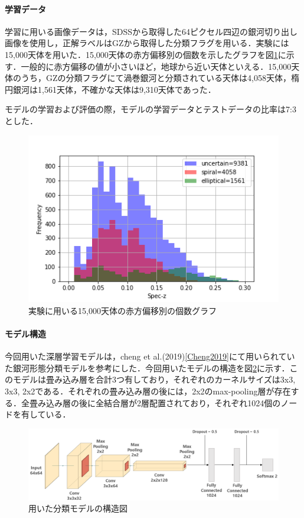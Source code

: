 \documentclass[a4j, 11pt]{jarticle}
\begin{document}
\paragraph{学習データ}
学習に用いる画像データは，SDSSから取得した64ピクセル四辺の銀河切り出し画像を使用し，正解ラベルはGZから取得した分類フラグを用いる．実験には15,000天体を用いた．15,000天体の赤方偏移別の個数を示したグラフを図\ref{fig:z_15000}に示す．一般的に赤方偏移の値が小さいほど，地球から近い天体といえる．15,000天体のうち，GZの分類フラグにて渦巻銀河と分類されている天体は4,058天体，楕円銀河は1,561天体，不確かな天体は9,310天体であった．

モデルの学習および評価の際，モデルの学習データとテストデータの比率は7:3とした．

\begin{figure}[h]
 \centering
 \includegraphics[width=14cm]{images/z_15000_4.png}
 \caption{実験に用いる15,000天体の赤方偏移別の個数グラフ}
 \label{fig:z_15000}
\end{figure}

\paragraph{モデル構造}
今回用いた深層学習モデルは，cheng et al.(2019)\ref{Cheng2019}にて用いられていた銀河形態分類モデルを参考にした．今回用いたモデルの構造を図\ref{fig:model_shape}に示す．このモデルは畳み込み層を合計3つ有しており，それぞれのカーネルサイズは3x3, 3x3, 2x2である．それぞれの畳み込み層の後には，2x2のmax-pooling層が存在する．全畳み込み層の後に全結合層が2層配置されており，それぞれ1024個のノードを有している．

\begin{figure}[h]
	\centering
	\includegraphics[width=14cm]{images/model_shape.PNG}
	\caption{用いた分類モデルの構造図}
	\label{fig:model_shape}
 \end{figure}
 
\end{document}
